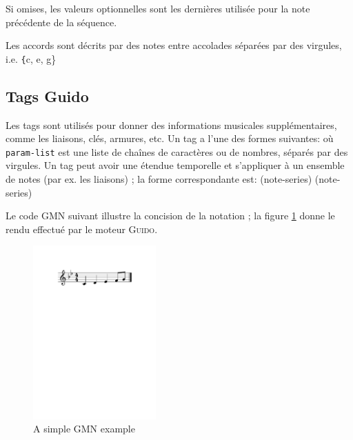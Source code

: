 \documentclass{article}
\newenvironment{gmncode}		{\vspace{-2mm}\small\verbatim}{\endverbatim\vspace{-2mm}}
\newcommand{\Guido}		{\textsc{Guido}}
\newcommand{\code}[1]		{{\small \texttt{#1}}}
\begin{document}
Si omises, les valeurs optionnelles sont les dernières utilisée pour la note précédente de la séquence.

Les accords sont décrits par des notes entre accolades séparées par des virgules, i.e. \code\{{c, e, g}\}


\subsection{Tags Guido}
Les tags sont utilisés pour donner des informations musicales supplémentaires, comme les liaisons, clés, armures, etc. Un tag a l'une des formes suivantes:
\begin{gmncode} 
   \tagname 
\end{gmncode}
\noindent où \code{param-list} est une liste de chaînes de caractères ou de nombres, séparés par des virgules. Un tag peut avoir une étendue temporelle et s'appliquer à un ensemble de notes (par ex. les liaisons) ; la forme correspondante est:
\begin{gmncode} 
   \tagname(note-series)
   (note-series)
\end{gmncode} 

Le code GMN suivant illustre la concision de la notation ; la figure \ref{ex1} donne le rendu effectué par le moteur \Guido. 
\begin{gmncode} 
  [ \meter<"4/4"> \key<-2> c d e& f/8 g ]
\end{gmncode} 

\begin{figure}[h]
	\centering \includegraphics[width=47mm]{imgs/ex1}
 \caption{A simple GMN example}
 \label{ex1}
\end{figure}
\end{document}
